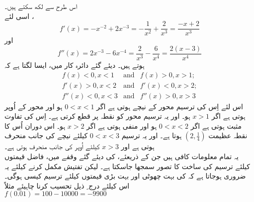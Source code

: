         اس طرح سے  لکھ سکتے ہیں۔\\
اسی لئے ،
\[f'(x)=-x^{-2}+2x^{-3}=- \frac{1}{x^2}+\frac{2}{x^3}=\frac{-x+2}{x^3}\]
اور  
\[f''(x)=2x^{-3}-6x^{-4} =\frac{2}{x^3}-\frac{6}{x^4} =\frac{2(x-3)}{x^4}\]
  ہوتے ہیں۔ 
دیئے گئے دائرہ کار میں، ایسا لگتا ہے کہ                      
 \[
\begin{array}{lcl}
f(x)<0,x<1 & \text{and} & f(x)>0,x>1; \\
 f'(x)>0,x<2  & \text{and} & f'(x)<0,x>2; \\
 f''(x)<0,x<3  & \text{and} &  f''(x)>0,x>3 
\end{array}
\]    
اس لئے اِس کی ترسیم   محور کے نیچے ہوتی ہے اگر  
\( 0<x<1\)
 ہو اور    محور کے اُوپر ہوتی ہے اگر   
 \(x>1\)
  ہو۔ اور یہ ترسیم   محور کو نقطہ   پر قطع کرتی ہے۔ اِس کی تفاوت مثبت ہوتی ہے اگر   
  \(0<x<2\)
  ہو اور منفی ہوتی ہے اگر 
  \(x>2\)
     ہو۔ اس دوران اُس کا نقطہ عظیمت  
     \((2,\frac{1}{4})\)
       ہوتا ہے۔  اور یہ ترسیم   
       \(0<x<3\)
       کیلئے نیچے کی جانب منحرف ہوتی ہے اور 
       \(x>3\)
         کیلئے اُوپر کی جانب منحرف ہوتی ہے۔ \\
	یہ تمام معلومات کافی ہیں جن کے ذریعئے،  کی دیئے گئے وقفے میں،   فاضل قیمتوں  کیلئے  ترسیم کی ساخت کا تصور سمجھا جاسکتا ہے۔ لیکن تفتیش مکمل کرنے کیلئے یہ ضروری ہوجاتا ہے کہ   کی بہت چھوٹی اور بہت بڑی قیمتوں کیلئے ترسیم کیسی ہوگی۔ اس کیلئے درج  ِ ذیل تحسیب کرنا چاہیئے مثلاً \\
	  \(f(0.01)=100-10000=-9900\)

